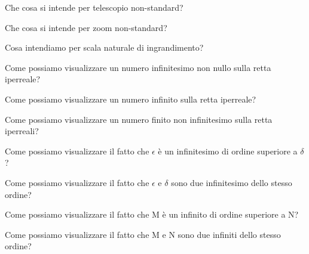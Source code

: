 \begin{multicols}{2}
\begin{esercizio}\label{ese:iper_035}
Che cosa si intende per telescopio non-standard?
\end{esercizio}

\begin{esercizio}\label{ese:iper_036}
Che cosa si intende per zoom non-standard?
\end{esercizio}

\begin{esercizio}\label{ese:iper_037}
Cosa intendiamo per scala naturale di ingrandimento?
\end{esercizio}

\begin{esercizio}\label{ese:iper_038}
Come possiamo visualizzare un numero infinitesimo non nullo sulla retta 
iperreale?
\end{esercizio}

\begin{esercizio}\label{ese:iper_039}
Come possiamo visualizzare un numero infinito sulla retta iperreale?
\end{esercizio}

\begin{esercizio}\label{ese:iper_040}
Come possiamo visualizzare un numero finito non infinitesimo sulla retta 
iperreali?
\end{esercizio}

\begin{esercizio}\label{ese:iper_041}
Come possiamo visualizzare il fatto che \(\epsilon\) è un infinitesimo di 
ordine superiore a \(\delta\)?
\end{esercizio}

\begin{esercizio}\label{ese:iper_042}
Come possiamo visualizzare il fatto che \(\epsilon\) e \(\delta\) sono due 
infinitesimo dello stesso ordine?
\end{esercizio}

\begin{esercizio}\label{ese:iper_043}
Come possiamo visualizzare il fatto che M è un infinito di ordine superiore 
a N?
\end{esercizio}

\begin{esercizio}\label{ese:iper_044}
Come possiamo visualizzare il fatto che M e N sono due infiniti dello 
stesso ordine?
\end{esercizio}

\end{multicols}

